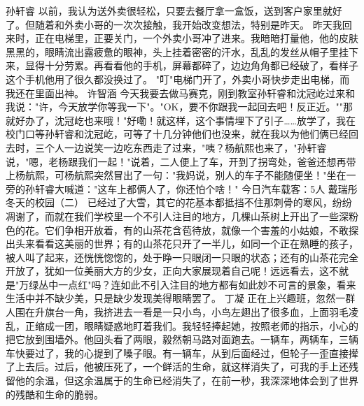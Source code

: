 {}\markdownRendererInterblockSeparator
{}孙轩睿\markdownRendererInterblockSeparator
{}以前，我认为送外卖很轻松，只要去餐厅拿一盒饭，送到客户家里就好了。但随着和外卖小哥的一次次接触，我开始改变想法，特别是昨天。\markdownRendererInterblockSeparator
{}昨天我回来时，正在电梯里，正要关门，一个外卖小哥冲了进来。我暗暗打量他，他的皮肤黑黑的，眼睛流出露疲惫的眼神，头上挂着密密的汗水，乱乱的发丝从帽子里挂下来，显得十分劳累。再看看他的手机，屏幕都碎了，边边角角都已经破了，看样子这个手机他用了很久都没换过了。\markdownRendererInterblockSeparator
{}"叮"电梯门开了，外卖小哥快步走出电梯，而我还在里面出神。\markdownRendererInterblockSeparator
{}\markdownRendererInterblockSeparator
{}许智涵\markdownRendererInterblockSeparator
{}今天我要去做马赛克，刚到教室孙轩睿和沈冠屹过来和我说："许，今天放学你等我一下"。"OK，要不你跟我一起回去吧！反正近。""那就好办了，沈冠屹也来哦！"好嘞！就这样，这个事情埋下了引子……放学了，我在校门口等孙轩睿和沈冠屹，可等了十几分钟他们也没来，就在我以为他们俩已经回去时，三个人一边说笑一边吃东西走了过来，"咦？杨航熙也来了，"孙轩睿说，"嗯，老杨跟我们一起！"说着，二人便上了车，开到了拐弯处，爸爸还想再带上杨航熙，可杨航熙突然冒出了一句："我妈说，别人的车子不能随便坐！"坐在一旁的孙轩睿大喊道："这车上都俩人了，你还怕个啥！"\markdownRendererInterblockSeparator
{}今日汽车载客：5人\markdownRendererInterblockSeparator
{}\markdownRendererInterblockSeparator
{}戴瑞彤\markdownRendererInterblockSeparator
{}冬天的校园（二）\markdownRendererInterblockSeparator
{}已经过了大雪，其它的花基本都抵挡不住那刺骨的寒风，纷纷凋谢了，而就在我们学校里一个不引人注目的地方，几棵山茶树上开出了一些深粉色的花。它们争相开放着，有的山茶花含苞待放，就像一个害羞的小姑娘，不敢探出头来看看这美丽的世界；有的山茶花只开了一半儿，如同一个正在熟睡的孩子，被人叫了起来，还恍恍惚惚的，处于睁一只眼闭一只眼的状态；还有的山茶花完全开放了，犹如一位美丽大方的少女，正向大家展现着自己呢！远远看去，这不就是"万绿丛中一点红"吗？连如此不引入注目的地方都有如此妙不可言的景象，看来生活中并不缺少美，只是缺少发现美得眼睛罢了。\markdownRendererInterblockSeparator
{}\markdownRendererInterblockSeparator
{}丁凝\markdownRendererInterblockSeparator
{}正在上兴趣班，忽然一群人围在升旗台一角，我挤进去一看是一只小鸟，小鸟左翅出了很多血，上面羽毛凌乱，正缩成一团，眼睛疑惑地盯着我们。我轻轻捧起她，按照老师的指示，小心的把它放到围墙外。他回头看了两眼，毅然朝马路对面跑去。一辆车，两辆车，三辆车快要过了，我的心提到了嗓子眼。有一辆车，从到后面经过，但轮子一歪直接撵了上去后。过后，他被压死了，一个鲜活的生命，就这样消失了，可我的手上还残留他的余温，但这余温属于的生命已经消失了，在前一秒，我深深地体会到了世界的残酷和生命的脆弱。\markdownRendererInterblockSeparator

